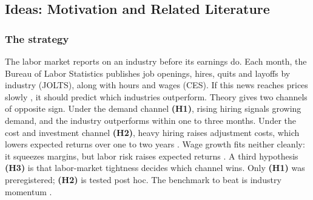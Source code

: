 \documentclass[11pt,letterpaper]{article}
\begin{document}
\subsection{Ideas: Motivation and Related Literature}\label{sec:ideas}

\subsubsection{The strategy}
The labor market reports on an industry before its earnings do. Each month,
the Bureau of Labor Statistics publishes job openings, hires, quits and layoffs
by industry (JOLTS), along with hours and wages (CES). If this news reaches
prices slowly \citep{hong2007}, it should predict which industries outperform.
Theory gives two channels of opposite sign. Under the demand channel \textbf{(H1)},
rising hiring signals growing demand, and the industry outperforms within one
to three months. Under the cost and investment channel \textbf{(H2)}, heavy hiring
raises adjustment costs, which lowers expected returns over one to two years
\citep{belo2014}. Wage growth fits neither cleanly: it squeezes margins, but
labor risk raises expected returns \citep{kuehn2017,donangelo2019}. A third
hypothesis \textbf{(H3)} is that labor-market tightness decides which channel wins.
Only \textbf{(H1)} was preregistered; \textbf{(H2)} is tested post hoc. The benchmark to beat is
industry momentum \citep{moskowitz1999,zarattini2024}.
\end{document}
